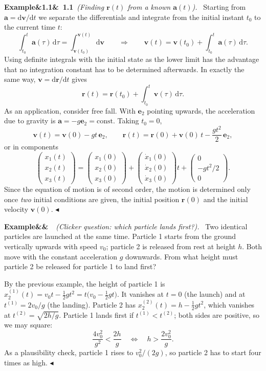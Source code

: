 \documentclass[11pt,a4paper,oneside]{report}
\numberwithin{equation}{chapter}
\newcommand{\vect}[1]{\bm{#1}}
\newcommand{\e}[1]{\vect{e}_{#1}}
\newcommand{\dd}{\,\mathrm{d}}
\theoremstyle{plain}
\theoremstyle{definition}
\theoremstyle{remark}
\newenvironment{example}[2]{%
  \par\addvspace{\bigskipamount}\noindent
  \textbf{Example\ifx&#1&\else~#1\fi}\ \textit{(#2).}\ \ignorespaces}%
  {\hfill$\blacktriangleleft$\par\addvspace{\bigskipamount}}
\begin{document}
\begin{example}{1.1}{Finding $\vect r(t)$ from a known $\vect a(t)$}
Starting from $\vect a=\mathrm d\vect v/\mathrm dt$ we separate the differentials and integrate from the initial
instant $t_0$ to the current time $t$:
\[
  \int_{t_0}^{t}\vect a(\tau)\dd\tau=\int_{\vect v(t_0)}^{\vect v(t)}\dd\vect v
  \qquad\Longrightarrow\qquad
  \vect v(t)=\vect v(t_0)+\int_{t_0}^{t}\vect a(\tau)\dd\tau .
\]
Using definite integrals with the initial state as the lower limit has the advantage that no integration constant
has to be determined afterwards. In exactly the same way, $\vect v=\mathrm d\vect r/\mathrm dt$ gives
\[
  \vect r(t)=\vect r(t_0)+\int_{t_0}^{t}\vect v(\tau)\dd\tau .
\]
As an application, consider free fall. With $\e2$ pointing upwards, the acceleration due to gravity is
$\vect a=-g\e2=\text{const}$. Taking $t_0=0$,
\[
  \vect v(t)=\vect v(0)-gt\,\e2,\qquad
  \vect r(t)=\vect r(0)+\vect v(0)\,t-\frac{gt^2}{2}\,\e2 ,
\]
or in components
\[
  \begin{pmatrix}x_1(t)\\x_2(t)\\x_3(t)\end{pmatrix}
  =\begin{pmatrix}x_1(0)\\x_2(0)\\x_3(0)\end{pmatrix}
  +\begin{pmatrix}\dot x_1(0)\\\dot x_2(0)\\\dot x_3(0)\end{pmatrix}t
  +\begin{pmatrix}0\\-gt^2/2\\0\end{pmatrix}.
\]
Since the equation of motion is of second order, the motion is determined only once \emph{two} initial conditions
are given, the initial position $\vect r(0)$ and the initial velocity $\vect v(0)$.
\end{example}

\begin{example}{}{Clicker question: which particle lands first?}
Two identical particles are launched at the same time. Particle 1 starts from the ground vertically upwards with
speed $v_0$; particle 2 is released from rest at height $h$. Both move with the constant acceleration $g$
downwards. From what height must particle 2 be released for particle 1 to land first?

By the previous example, the height of particle 1 is
$x_2^{(1)}(t)=v_0t-\tfrac12gt^2=t\big(v_0-\tfrac12gt\big)$. It vanishes at $t=0$ (the launch) and at
$t^{(1)}=2v_0/g$ (the landing). Particle 2 has $x_2^{(2)}(t)=h-\frac12gt^2$, which vanishes at
$t^{(2)}=\sqrt{2h/g}$. Particle 1 lands first if $t^{(1)}<t^{(2)}$; both sides are positive, so we may square:
\[
  \frac{4v_0^2}{g^2}<\frac{2h}{g}\quad\Longleftrightarrow\quad h>\frac{2v_0^2}{g}.
\]
As a plausibility check, particle 1 rises to $v_0^2/(2g)$, so particle 2 has to start four times as high.
\end{example}
\end{document}

